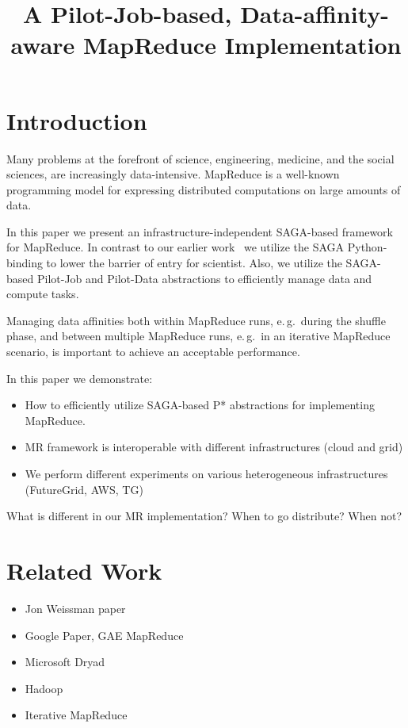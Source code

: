 \documentclass[conference,final]{IEEEtran}
\title{A Pilot-Job-based, Data-affinity-aware MapReduce Implementation}
\author{  }
\begin{document}
\ifpdf
{}
\else
{}
\fi

\maketitle


\section{Introduction}

Many problems at the forefront of science, engineering, medicine, and the social 
sciences, are increasingly data-intensive. MapReduce is a well-known programming 
model for expressing distributed computations on large amounts of data.

In this paper we present an infrastructure-independent SAGA-based framework for 
MapReduce. In contrast to our earlier work~\cite{Sehgal2011590} we utilize the 
SAGA Python-binding to lower the barrier of entry for scientist. Also, we  
utilize the SAGA-based Pilot-Job and Pilot-Data abstractions to efficiently 
manage data and compute tasks.

Managing data affinities both within MapReduce runs, e.\,g.\ during the shuffle 
phase, and between multiple MapReduce runs, e.\,g.\ in an iterative MapReduce 
scenario, is important to achieve an acceptable performance.


In this paper we demonstrate:
\begin{itemize}
	\item How to efficiently utilize SAGA-based P* abstractions for implementing 
	MapReduce.
	\item MR framework is interoperable with different infrastructures (cloud 
	and grid)
	\item We perform different experiments on various heterogeneous 
	infrastructures (FutureGrid, AWS, TG)
\end{itemize}



What is different in our MR implementation?
When to go distribute? When not?



\section{Related Work}

\begin{itemize}
	\item Jon Weissman paper
	\item Google Paper, GAE MapReduce
	\item Microsoft Dryad
	\item Hadoop
	\item Iterative MapReduce
\end{itemize}
\end{document}
